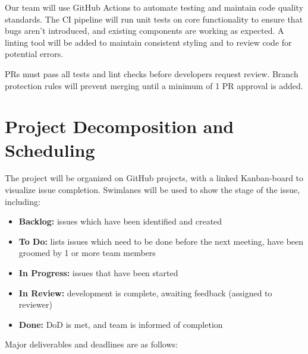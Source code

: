 \documentclass{article}
\begin{document}
Our team will use GitHub Actions to automate testing and maintain code quality standards. The CI pipeline will run unit tests on core functionality to ensure that bugs aren’t introduced, and existing components are working as expected. A linting tool will be added to maintain consistent styling and to review code for potential errors.

PRs must pass all tests and lint checks before developers request review. Branch protection rules will prevent merging until a minimum of 1 PR approval is added.

\section{Project Decomposition and Scheduling}
\begin{comment}
\begin{itemize}
  \item How will you be using GitHub projects?
  \item Include a link to your GitHub project
\end{itemize}

\wss{How will the project be scheduled?  This is the big picture schedule, not
details. You will need to reproduce information that is in the course outline
for deadlines.}
\end{comment}

The project will be organized on GitHub projects, with a linked Kanban-board to visualize issue completion. Swimlanes will be used to show the stage of the issue, including:

\begin{itemize}
    \item \textbf{Backlog:} issues which have been identified and created
    \item \textbf{To Do:} lists issues which need to be done before the next meeting, have been groomed by 1 or more team members
    \item \textbf{In Progress:} issues that have been started
    \item \textbf{In Review:} development is complete, awaiting feedback (assigned to reviewer)
    \item \textbf{Done:} DoD is met, and team is informed of completion
\end{itemize}

Major deliverables and deadlines are as follows:
\end{document}
